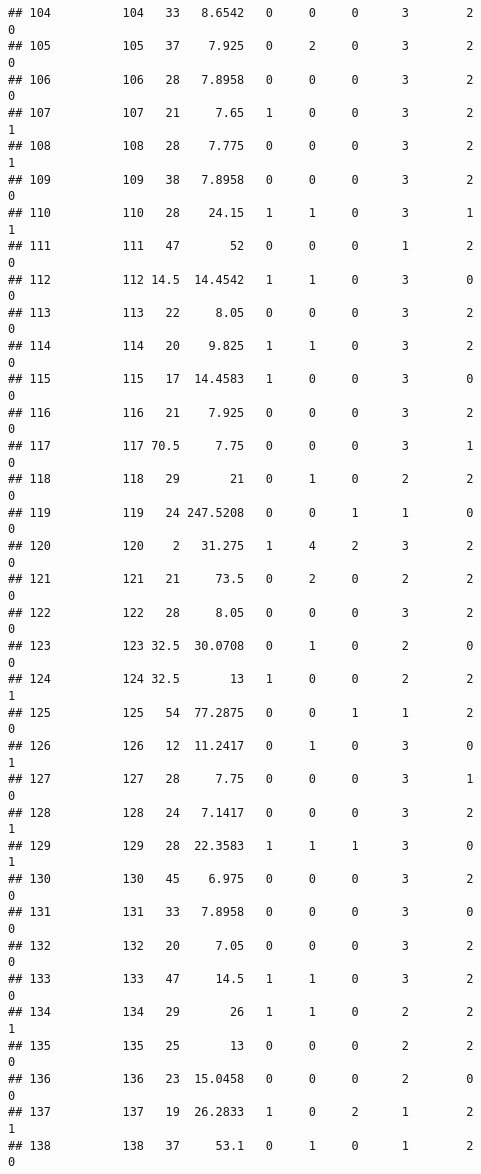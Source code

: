 \documentclass[
]{article}
\begin{document}
\begin{verbatim}
## 104          104   33   8.6542   0     0     0      3        2         0
## 105          105   37    7.925   0     2     0      3        2         0
## 106          106   28   7.8958   0     0     0      3        2         0
## 107          107   21     7.65   1     0     0      3        2         1
## 108          108   28    7.775   0     0     0      3        2         1
## 109          109   38   7.8958   0     0     0      3        2         0
## 110          110   28    24.15   1     1     0      3        1         1
## 111          111   47       52   0     0     0      1        2         0
## 112          112 14.5  14.4542   1     1     0      3        0         0
## 113          113   22     8.05   0     0     0      3        2         0
## 114          114   20    9.825   1     1     0      3        2         0
## 115          115   17  14.4583   1     0     0      3        0         0
## 116          116   21    7.925   0     0     0      3        2         0
## 117          117 70.5     7.75   0     0     0      3        1         0
## 118          118   29       21   0     1     0      2        2         0
## 119          119   24 247.5208   0     0     1      1        0         0
## 120          120    2   31.275   1     4     2      3        2         0
## 121          121   21     73.5   0     2     0      2        2         0
## 122          122   28     8.05   0     0     0      3        2         0
## 123          123 32.5  30.0708   0     1     0      2        0         0
## 124          124 32.5       13   1     0     0      2        2         1
## 125          125   54  77.2875   0     0     1      1        2         0
## 126          126   12  11.2417   0     1     0      3        0         1
## 127          127   28     7.75   0     0     0      3        1         0
## 128          128   24   7.1417   0     0     0      3        2         1
## 129          129   28  22.3583   1     1     1      3        0         1
## 130          130   45    6.975   0     0     0      3        2         0
## 131          131   33   7.8958   0     0     0      3        0         0
## 132          132   20     7.05   0     0     0      3        2         0
## 133          133   47     14.5   1     1     0      3        2         0
## 134          134   29       26   1     1     0      2        2         1
## 135          135   25       13   0     0     0      2        2         0
## 136          136   23  15.0458   0     0     0      2        0         0
## 137          137   19  26.2833   1     0     2      1        2         1
## 138          138   37     53.1   0     1     0      1        2         0

\end{verbatim}
\end{document}
